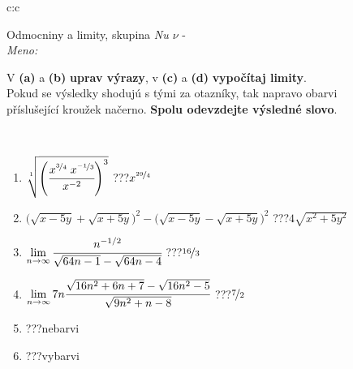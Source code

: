 \documentclass[10pt]{report}
\begin{document}
\newpage
\thispagestyle{empty}
\begin{tabular}{c:c}
\begin{minipage}[c][104.5mm][t]{0.5\linewidth}
\begin{center}
\vspace{7mm}
{\huge Odmocniny a limity, skupina \textit{Nu $\nu$} -}\\[5mm]
\textit{Meno:}\phantom{xxxxxxxxxxxxxxxxxxxxxxxxxxxxxxxxxxxxxxxxxxxxxxxxxxxxxxxxxxxxxxxxx}\\[5mm]
\begin{minipage}{0.95\linewidth}
\begin{center}
V \textbf{(a)} a \textbf{(b)} \textbf{uprav výrazy}, v \textbf{(c)} a \textbf{(d)} \textbf{vypočítaj limity}.\\Pokud se výsledky shodujú s tými za otazníky, tak napravo obarvi\\příslušející kroužek načerno. \textbf{Spolu odevzdejte výsledné slovo}.
\end{center}
\end{minipage}
\\[1mm]
\begin{minipage}{0.79\linewidth}
\begin{center}
\begin{varwidth}{\linewidth}
\begin{enumerate}
\small
\item $\sqrt[1]{\left(\cfrac{x^{\nicefrac{3}{4}}\;x^{\nicefrac{-1}{3}}}{x^{-2}}\right)^{3}}$\quad \dotfill\; ???\;\dotfill \quad $x^{\nicefrac{29}{4}}$
\item {\footnotesize{\scriptsize$\big(\sqrt{x-5y}+\sqrt{x+5y}\big)^2-\big(\sqrt{x-5y}-\sqrt{x+5y}\big)^2$}\quad \dotfill\; ???\;\dotfill \quad $4\sqrt{x^2+5y^2}$}
\item $\lim\limits_{n\to\infty}\cfrac{n^{-1/2}}{\sqrt{64n-1}-\sqrt{64n-4}}$\quad \dotfill\; ???\;\dotfill \quad $\nicefrac{16}{3}$
\item $\lim\limits_{n\to\infty}7n\cfrac{\sqrt{16n^2+6n+7}-\sqrt{16n^2-5}}{\sqrt{9n^2+n-8}}$\quad \dotfill\; ???\;\dotfill \quad $\nicefrac{7}{2}$
\item \quad \dotfill\; ???\;\dotfill \quad nebarvi
\item \quad \dotfill\; ???\;\dotfill \quad vybarvi
\end{enumerate}
\end{varwidth}
\end{center}
\end{minipage}
\begin{minipage}{0.20\linewidth}

\end{minipage}
\end{center}
\end{minipage}
\end{tabular}
\end{document}
